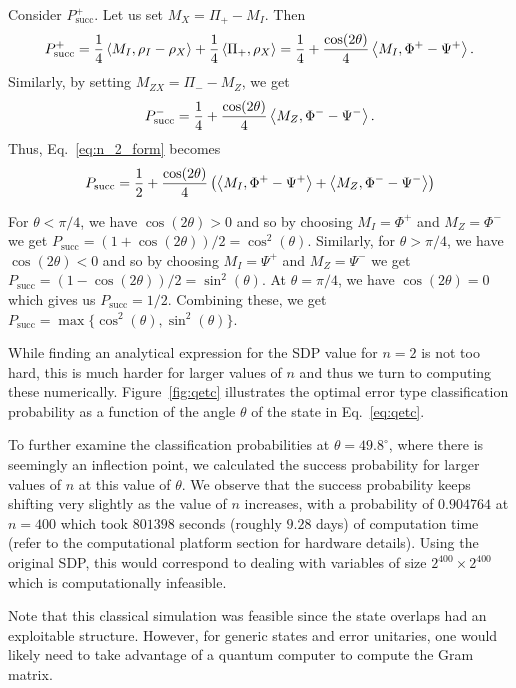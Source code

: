 Consider $P_{\mathrm{succ}}^+$.
Let us set $M_X = \Pi_+ - M_I$.
Then
\begin{equation*}
    P_{\mathrm{succ}}^+ = \frac{1}{4} \left\langle M_I, \rho_I - \rho_X \right\rangle + \frac{1}{4} \left\langle \Pi_+, \rho_X \right\rangle = \frac{1}{4} + \frac{\cos(2 \theta)}{4} \left\langle M_I, \Phi^+ - \Psi^+ \right\rangle.
\end{equation*}
Similarly, by setting $M_{ZX} = \Pi_- - M_Z$, we get
\begin{equation*}
    P_{\mathrm{succ}}^- = \frac{1}{4} + \frac{\cos(2 \theta)}{4} \left\langle M_Z, \Phi^- - \Psi^- \right\rangle.
\end{equation*}
Thus, Eq.~\eqref{eq:n_2_form} becomes
\begin{equation*}
    P_{\mathrm{succ}} = \frac{1}{2} + \frac{\cos(2 \theta)}{4} \left( \left\langle M_I, \Phi^+ - \Psi^+ \right\rangle + \left\langle M_Z, \Phi^- - \Psi^- \right\rangle \right)
\end{equation*}

For $\theta < \pi/4$, we have $\cos(2 \theta) > 0$ and so by choosing $M_I = \Phi^+$ and $M_Z = \Phi^-$ we get $P_\mathrm{succ} = (1 + \cos(2 \theta))/2 = \cos^2(\theta)$.
Similarly, for $\theta > \pi/4$, we have $\cos(2 \theta) < 0$ and so by choosing $M_I = \Psi^+$ and $M_Z = \Psi^-$ we get $P_\mathrm{succ} = (1 - \cos(2 \theta))/2 = \sin^2(\theta)$.
At $\theta = \pi/4$, we have $\cos(2 \theta) = 0$ which gives us $P_\mathrm{succ} = 1/2$.
Combining these, we get $P_\mathrm{succ} = \max\{ \cos^2(\theta), \sin^2(\theta) \}$.

While finding an analytical expression for the SDP value for $n=2$ is not too hard, this is much harder for larger values of $n$ and thus we turn to computing these numerically. 
Figure~\ref{fig:qetc} illustrates the optimal error type classification probability as a function of the angle $\theta$ of the state in Eq.~\eqref{eq:qetc}. 

To further examine the classification probabilities at $\theta = 49.8^\circ$, where there is seemingly an inflection point, we calculated the success probability for larger values of $n$ at this value of $\theta$. 
We observe that the success probability keeps shifting very slightly as the value of $n$ increases, with a probability of $0.904764$ at $n = 400$ which took $801398$ seconds (roughly $9.28$ days) of computation time (refer to the computational platform section for hardware details). 
Using the original SDP, this would correspond to dealing with variables of size $2^{400} \times 2^{400}$ which is computationally infeasible. 

\begin{remark} 
Note that this classical simulation was feasible since the state overlaps had an exploitable structure. 
However, for generic states and error unitaries, one would likely need to take advantage of a quantum computer to compute the Gram matrix. 
\end{remark} 

